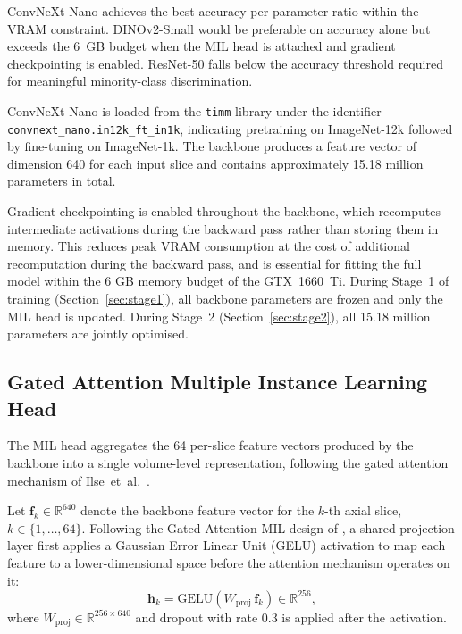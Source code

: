 ConvNeXt-Nano achieves the best accuracy-per-parameter
ratio within the VRAM constraint.
DINOv2-Small would be preferable on accuracy alone
but exceeds the 6~GB budget when the MIL head is
attached and gradient checkpointing is enabled.
ResNet-50 falls below the accuracy threshold required
for meaningful minority-class discrimination.

ConvNeXt-Nano is loaded from the \texttt{timm} library
under the identifier \texttt{convnext\_nano.in12k\_ft\_in1k},
indicating pretraining on ImageNet-12k followed by
fine-tuning on ImageNet-1k.
The backbone produces a feature vector of dimension 640 for
each input slice and contains approximately 15.18 million
parameters in total.

Gradient checkpointing is enabled throughout the backbone,
which recomputes intermediate activations during the backward
pass rather than storing them in memory.
This reduces peak VRAM consumption at the cost of
additional recomputation during the backward pass,
and is essential for fitting the full model
within the 6 GB memory budget of the GTX~1660~Ti.
During Stage~1 of training (Section~\ref{sec:stage1}),
all backbone parameters are frozen and only the MIL head
is updated.
During Stage~2 (Section~\ref{sec:stage2}), all 15.18 million
parameters are jointly optimised.


\subsection{Gated Attention Multiple Instance Learning Head}
\label{sec:mil-head}

The MIL head aggregates the 64 per-slice feature vectors
produced by the backbone into a single volume-level
representation, following the gated attention mechanism of
Ilse~et~al.\ \cite{ilse2018attention}.

Let $\mathbf{f}_k \in \mathbb{R}^{640}$ denote the backbone
feature vector for the $k$-th axial slice,
$k \in \{1, \ldots, 64\}$.
Following the Gated Attention MIL design of
\textcite{ilse2018attention}, a shared projection layer
first applies a Gaussian Error Linear Unit (GELU)
activation to map each feature to a lower-dimensional
space before the attention mechanism operates on it:
\begin{equation}
  \mathbf{h}_k = \mathrm{GELU}(W_{\mathrm{proj}}\,\mathbf{f}_k)
  \in \mathbb{R}^{256},
  \label{eq:proj}
\end{equation}
where $W_{\mathrm{proj}} \in \mathbb{R}^{256 \times 640}$
and dropout with rate 0.3 is applied after the activation.

